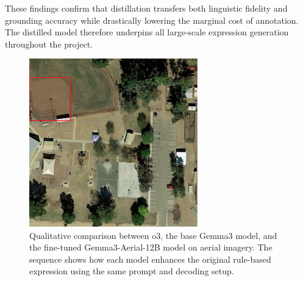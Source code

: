 These findings confirm that distillation transfers both linguistic fidelity and grounding accuracy while drastically lowering the marginal cost of annotation. The distilled model therefore underpins all large-scale expression generation throughout the project.

\begin{figure}[t]
\centering
\begin{minipage}{0.5\textwidth}
\centering
\includegraphics[width=0.65\textwidth]{Images/3llm.png}
\end{minipage}%
\begin{minipage}{0.5\textwidth}
\centering
\hspace{-1cm}
\end{minipage}
\caption{Qualitative comparison between o3, the base Gemma3 model, and the fine-tuned Gemma3-Aerial-12B model on aerial imagery. The sequence shows how each model enhances the original rule-based expression using the same prompt and decoding setup.}
\label{fig:distillation_comparison}
\end{figure}

